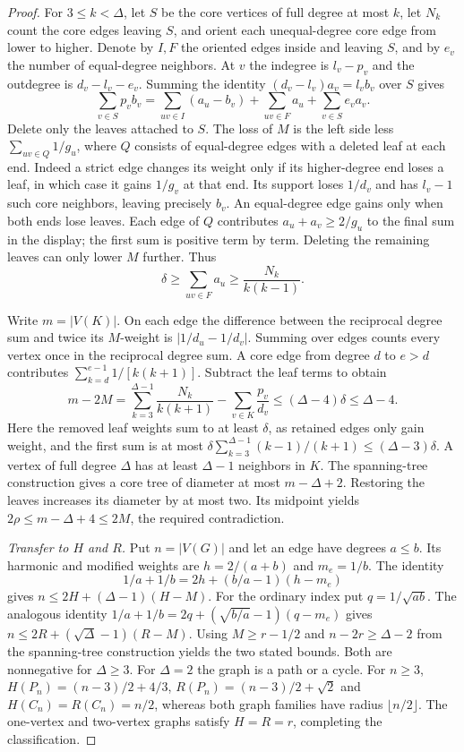 \documentclass[11pt,a4paper]{article}
\theoremstyle{remark}\newtheorem*{remark}{Remark}
\begin{document}
\begin{proof}
For $3\le k<\Delta$, let $S$ be the core vertices of full degree at
most $k$, let $N_k$ count the core edges leaving $S$, and orient each
unequal-degree core edge from lower to higher. Denote by $I,F$ the
oriented edges inside and leaving $S$, and by $e_v$ the number of
equal-degree neighbors. At $v$ the indegree is $l_v-p_v$ and the
outdegree is $d_v-l_v-e_v$. Summing the identity
$(d_v-l_v)a_v=l_vb_v$ over $S$ gives
\[
 \sum_{v\in S}p_v b_v
  =\sum_{uv\in I}(a_u-b_v)+\sum_{uv\in F}a_u+\sum_{v\in S}e_v a_v.
\]
Delete only the leaves attached to $S$. The loss of $M$ is the left
side less $\sum_{uv\in Q}1/g_u$, where $Q$ consists of equal-degree
edges with a deleted leaf at each end. Indeed a strict edge changes its
weight only if its higher-degree end loses a leaf, in which case it gains
$1/g_v$ at that end. Its support loses $1/d_v$ and has $l_v-1$ such
core neighbors, leaving precisely $b_v$. An equal-degree edge gains
only when both ends lose leaves.
Each edge of $Q$ contributes $a_u+a_v\ge2/g_u$ to the final sum in the
display; the first sum is positive term by term. Deleting the remaining
leaves can only lower $M$ further. Thus
\[
 \delta\ge\sum_{uv\in F}a_u\ge \frac{N_k}{k(k-1)}.
\]

Write $m=|V(K)|$. On each edge the difference between the reciprocal
degree sum and twice its $M$-weight is $|1/d_u-1/d_v|$. Summing over
edges counts every vertex once in the reciprocal degree sum.
A core edge from degree $d$ to $e>d$ contributes
$\sum_{k=d}^{e-1}1/[k(k+1)]$. Subtract the leaf terms to obtain
\[
 m-2M=\sum_{k=3}^{\Delta-1}\frac{N_k}{k(k+1)}
          -\sum_{v\in K}\frac{p_v}{d_v}\le(\Delta-4)\delta\le\Delta-4.
\]
Here the removed leaf weights sum to at least $\delta$, as retained
edges only gain weight, and the first sum is at most
$\delta\sum_{k=3}^{\Delta-1}(k-1)/(k+1)\le(\Delta-3)\delta$.
A vertex of full degree $\Delta$ has at least $\Delta-1$ neighbors
in $K$. The spanning-tree construction gives a core tree of diameter
at most $m-\Delta+2$. Restoring the leaves increases its diameter by
at most two. Its midpoint yields $2\rho\le m-\Delta+4\le2M$, the
required contradiction.

\emph{Transfer to $H$ and $R$.} Put $n=|V(G)|$ and let an edge have
degrees $a\le b$. Its harmonic and modified weights are
$h=2/(a+b)$ and $m_e=1/b$. The identity
\[
 1/a+1/b=2h+(b/a-1)(h-m_e)
\]
gives $n\le2H+(\Delta-1)(H-M)$. For the ordinary index put
$q=1/\sqrt{ab}$. The analogous identity
$1/a+1/b=2q+(\sqrt{b/a}-1)(q-m_e)$ gives
$n\le2R+(\sqrt\Delta-1)(R-M)$. Using
$M\ge r-1/2$ and $n-2r\ge\Delta-2$ from the spanning-tree
construction yields the two stated bounds. Both are nonnegative for
$\Delta\ge3$. For $\Delta=2$ the graph is a path or a cycle.
For $n\ge3$,
$H(P_n)=(n-3)/2+4/3$, $R(P_n)=(n-3)/2+\sqrt2$ and
$H(C_n)=R(C_n)=n/2$, whereas both graph families have radius
$\lfloor n/2\rfloor$. The one-vertex and two-vertex graphs satisfy
$H=R=r$, completing the classification.
\end{proof}
\end{document}
